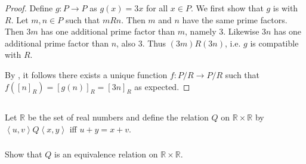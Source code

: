 \documentclass{report}
\newcommand{\pair}[1]{\left< #1 \right>}
\begin{document}
\begin{proof}

  Define $g \colon P \rightarrow P$ as $g(x) = 3x$ for all $x \in P$.
  We first show that $g$ is  with $R$.
  Let $m, n \in P$ such that $mRn$.
  Then $m$ and $n$ have the same prime factors.
  Then $3m$ has one additional prime factor than $m$, namely $3$.
  Likewise $3n$ has one additional prime factor than $n$, also $3$.
  Thus $(3m)R(3n)$, i.e. $g$ is compatible with $R$.

  By , it follows there exists a unique function
    $f \colon P / R \rightarrow P / R$ such that $f([n]_R) = [g(n)]_R = [3n]_R$
    as expected.

\end{proof}

\subsection{}%

Let $\mathbb{R}$ be the set of real numbers and define the relation $Q$ on
  $\mathbb{R} \times \mathbb{R}$ by $\pair{u, v}Q\pair{x, y}$ iff
  $u + y = x + v$.

\subsubsection{}%

Show that $Q$ is an equivalence relation on $\mathbb{R} \times \mathbb{R}$.
\end{document}
